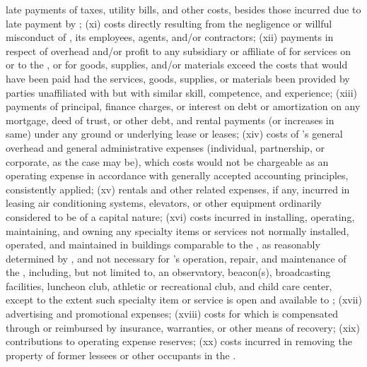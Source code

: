late payments of taxes, utility bills, and other costs, besides those incurred due to late payment by \lessee; (xi) costs directly resulting from the negligence or willful misconduct of \lessor, its employees, agents, and/or contractors; (xii) payments in respect of overhead and/or profit to any subsidiary or affiliate of \lessor for services on or to the \building, or for goods, supplies, and/or materials exceed the costs that would have been paid had the services, goods, supplies, or materials been provided by parties unaffiliated with \lessor but with similar skill, competence, and experience; (xiii) payments of principal, finance charges, or interest on debt or amortization on any mortgage, deed of trust, or other debt, and rental payments (or increases in same) under any ground or underlying lease or leases; (xiv) costs of \lessor's general overhead and general administrative expenses (individual, partnership, or corporate, as the case may be), which costs would not be chargeable as an operating expense in accordance with generally accepted accounting principles, consistently applied; (xv) rentals and other related expenses, if any, incurred in leasing air conditioning systems, elevators, or other equipment ordinarily considered to be of a capital nature; (xvi) costs incurred in installing, operating, maintaining, and owning any specialty items or services not normally installed, operated, and maintained in buildings comparable to the \building, as reasonably determined by \lessor, and not necessary for \lessor's operation, repair, and maintenance of the \building, including, but not limited to, an observatory, beacon(s), broadcasting facilities, luncheon club, athletic or recreational club, and child care center, except to the extent such specialty item or service is open and available to \lessee; (xvii) advertising and promotional expenses; (xviii) costs for which \lessor is compensated through or reimbursed by insurance, warranties, or other means of recovery; (xix) contributions to operating expense reserves; (xx) costs incurred in removing the property of former lessees or other occupants in the \building.
